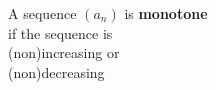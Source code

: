 \documentclass[border=6pt]{standalone}
\begin{document}
\parbox{2in}{A sequence $(a_n)$ is \textbf{monotone} \\
  \null\quad if the sequence is \\
  \null\quad\quad (non)increasing or \\
  \null\quad\quad (non)decreasing}
\end{document}
